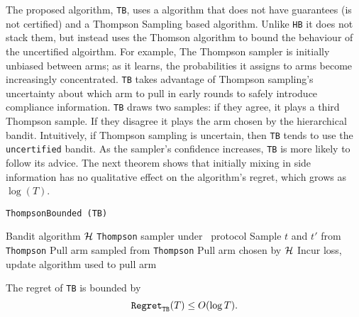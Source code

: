 The proposed algorithm, \texttt{TB}, uses a algorithm that does not have guarantees (is not certified) and a Thompson Sampling based algorithm. Unlike \texttt{HB} it does not stack them, but instead uses the Thomson algorithm to bound the behaviour of the uncertified algoirthm. For example, 
The Thompson sampler is initially unbiased between arms; as it learns, the probabilities it assigns to arms become increasingly concentrated. \texttt{TB} takes advantage of Thompson sampling's uncertainty about which arm to pull in early rounds to safely introduce compliance information. \texttt{TB} draws two samples: if they agree, it plays a third Thompson sample. If they disagree it plays the arm chosen by the hierarchical bandit.
Intuitively, if Thompson sampling is uncertain, then \texttt{TB} tends to use the \texttt{uncertified} bandit. As the sampler's confidence increases, \texttt{TB} is more likely to follow its advice. The next theorem shows that initially mixing in side information has no qualitative effect on the algorithm's regret, which grows as $\log(T)$. 



\begin{algorithm}[tb]
   \caption{\texttt{ThompsonBounded (TB)}}
   \begin{algorithmic}   
    Bandit algorithm ${\mathcal H}$
    \texttt{Thompson} sampler under \chosen\, protocol
	\STATE Sample $t$ and $t'$ from \texttt{Thompson}
	\STATE Pull arm sampled from \texttt{Thompson}
	\ELSE
	\STATE Pull arm chosen by ${\mathcal H}$
	\ENDIF
	\STATE Incur loss, update algorithm used to pull arm
   	\ENDFOR
   	\end{algorithmic}
\end{algorithm}



\begin{thm}\label{thm:tb}
	The regret of \texttt{TB} is bounded by
	\begin{equation}
		{\mathtt{Regret}}_{\texttt{TB}}(T) \leq O(\log T).
	\end{equation}
\end{thm}

